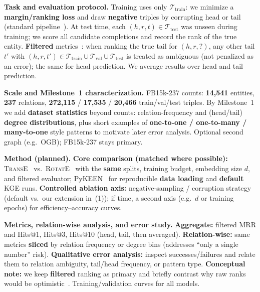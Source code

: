 \documentclass[10pt,a4paper]{article}
\begin{document}
\textbf{Task and evaluation protocol.}
Training uses only $\mathcal{T}_{\mathrm{train}}$: we minimize a \textbf{margin/ranking loss} and draw \textbf{negative} triples by corrupting head or tail (standard pipeline~\citep{bordes2013translating,sun2019rotate}). At test time, each $(h,r,t)\in\mathcal{T}_{\mathrm{test}}$ was unseen during training; we score all candidate completions and record the rank of the true entity. \textbf{Filtered} metrics~\citep{bordes2013translating}: when ranking the true tail for $(h,r,?)$, any other tail $t'$ with $(h,r,t')\in\mathcal{T}_{\mathrm{train}}\cup\mathcal{T}_{\mathrm{val}}\cup\mathcal{T}_{\mathrm{test}}$ is treated as ambiguous (not penalized as an error); the same for head prediction. We average results over head and tail prediction.

\textbf{Scale and Milestone~1 characterization.}
FB15k-237 counts: \textbf{14{,}541} entities, \textbf{237} relations, \textbf{272{,}115} / \textbf{17{,}535} / \textbf{20{,}466} train/val/test triples. By Milestone~1 we add \textbf{dataset statistics} beyond counts: relation-frequency and (head/tail) \textbf{degree distributions}, plus short examples of \textbf{one-to-one / one-to-many / many-to-one} style patterns to motivate later error analysis. Optional second graph (e.g.\ OGB); FB15k-237 stays primary.

\textbf{Method (planned).}
\textbf{Core comparison (matched where possible):} \textsc{TransE}~\citep{bordes2013translating} vs.\ \textsc{RotatE}~\citep{sun2019rotate} with the \textbf{same} splits, training budget, embedding size $d$, and filtered evaluator; PyKEEN~\citep{ali2021pykeen} for reproducible \textbf{data loading} and \textbf{default} KGE runs. \textbf{Controlled ablation axis:} negative-sampling / corruption strategy (default vs.\ our extension in~(1)); if time, a second axis (e.g.\ $d$ or training epochs) for efficiency--accuracy curves.

\textbf{Metrics, relation-wise analysis, and error study.}
\textbf{Aggregate:} filtered MRR and Hits@$1$, Hits@$3$, Hits@$10$ (head, tail, then averaged). \textbf{Relation-wise:} same metrics \textbf{sliced} by relation frequency or degree bins (addresses ``only a single number'' risk). \textbf{Qualitative error analysis:} inspect successes/failures and relate them to relation ambiguity, tail/head frequency, or pattern type. \textbf{Conceptual note:} we keep \textbf{filtered} ranking as primary and briefly contrast why raw ranks would be optimistic~\citep{bordes2013translating}. Training/validation curves for all models.
\end{document}
